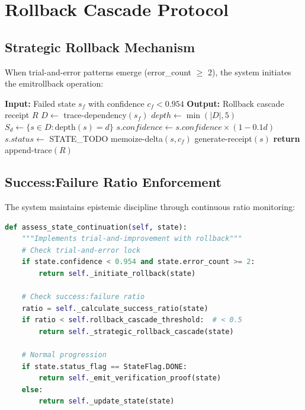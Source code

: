 \documentclass[11pt,conference]{IEEEtran}
\theoremstyle{definition}
\begin{document}
\section{Rollback Cascade Protocol}

\subsection{Strategic Rollback Mechanism}

When trial-and-error patterns emerge (error\_count $\geq$ 2), the system initiates the \gls{emitrollback} operation:

\begin{algorithm}
\caption{Cascade Rollback Protocol}
\begin{algorithmic}[1]
\STATE \textbf{Input:} Failed state $s_f$ with confidence $c_f < 0.954$
\STATE \textbf{Output:} Rollback cascade receipt $R$
\STATE $D \leftarrow$ trace-dependency$(s_f)$ 
\STATE $depth \leftarrow \min(|D|, 5)$ 
    \STATE $S_d \leftarrow \{s \in D : \text{depth}(s) = d\}$
        \STATE $s.confidence \leftarrow s.confidence \times (1 - 0.1d)$
        \STATE $s.status \leftarrow$ STATE\_TODO
        \STATE memoize-delta$(s, c_f)$ 
        \STATE generate-receipt$(s)$ 
    \ENDFOR
\ENDFOR
\STATE \textbf{return} append-trace$(R)$ 
\end{algorithmic}
\end{algorithm}

\subsection{Success:Failure Ratio Enforcement}

The system maintains epistemic discipline through continuous ratio monitoring:

\begin{lstlisting}[language=Python,caption={Python implementation of ratio enforcement}]
def assess_state_continuation(self, state):
    """Implements trial-and-improvement with rollback"""
    # Check trial-and-error lock
    if state.confidence < 0.954 and state.error_count >= 2:
        return self._initiate_rollback(state)
    
    # Check success:failure ratio
    ratio = self._calculate_success_ratio(state)
    if ratio < self.rollback_cascade_threshold:  # < 0.5
        return self._strategic_rollback_cascade(state)
    
    # Normal progression
    if state.status_flag == StateFlag.DONE:
        return self._emit_verification_proof(state)
    else:
        return self._update_state(state)
\end{lstlisting}
\end{document}
